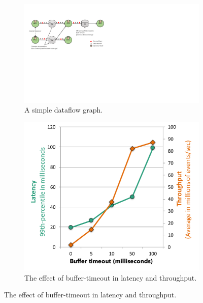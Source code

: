 \documentclass[11pt]{article}
\begin{document}
\begin{figure}[t!]
\begin{minipage}{1.1\linewidth}
      \centering
       \hspace{-0.1\linewidth}
      \begin{minipage}{0.55\linewidth}
        \begin{figure}[H]
        \centering
        \includegraphics[width=.999\textwidth,natheight=960,natwidth=540]{figs/dataflow.pdf}
        \vspace{-5mm}
        \caption{A simple dataflow graph.}
        \label{fig:dataflow}
        \end{figure}
      \end{minipage}
      \hspace{0.03\linewidth}
      \begin{minipage}{0.32\linewidth}
          \begin{figure}[H]
				\includegraphics[width=.99\textwidth,natheight=590,natwidth=500]{figs/latency-throughput.pdf}
				\vspace{-7mm}
    			\caption{The effect of buffer-timeout in latency and throughput.}
    			\label{fig:latency-throughput}
          \end{figure}
      \end{minipage}
  \end{minipage}
  \vspace{-4mm}
\end{figure}
\end{document}
